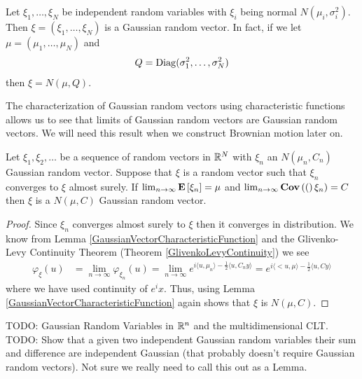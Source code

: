 \begin{examp}Let $\xi_1, \dots, \xi_N$ be independent random variables
  with $\xi_i$ being normal $N(\mu_i, \sigma_i^2)$.  Then $\xi =
  (\xi_1, \dots, \xi_N)$ is a Gaussian random vector.  In fact, if we
  let $\mu = (\mu_1, \dots, \mu_N)$ and 
\begin{align*}
Q = \operatorname*{Diag}(\sigma_1^2, \dots, \sigma_N^2)
\end{align*}
then $\xi = N(\mu, Q)$.
\end{examp}

The characterization of Gaussian random vectors using characteristic
functions allows us to see that limits of Gaussian random vectors are
Gaussian random vectors.  We will need this result when we construct
Brownian motion later on.
\begin{lem}\label{LimitOfGaussianRandomVectors}Let $\xi_1, \xi_2, \dots$ be a sequence of random
  vectors in $\mathbb{R}^N$ with $\xi_n$ an $N(\mu_n, C_n)$ Gaussian
  random vector.  Suppose that $\xi$ is a random vector such
  that $\xi_n$ converges to $\xi$ almost surely.  If $\lim_{n \to
    \infty} \textbf{E}\left[\xi_n\right] = \mu$ and $\lim_{n \to \infty}
  \textbf{Cov} \left (( \right )\xi_n) = C$ then $\xi$ is a $N(\mu, C)$ Gaussian random vector.
\end{lem}
\begin{proof}
Since $\xi_n$ converges almost surely to $\xi$ then it converges in
distribution.  We know from Lemma
\ref{GaussianVectorCharacteristicFunction} and the Glivenko-Levy
Continuity Theorem (Theorem \ref{GlivenkoLevyContinuity}) we see
\begin{align*}
\varphi_\xi(u) &= \lim_{n \to \infty} \varphi_{\xi_n}(u) = \lim_{n \to
  \infty} e^{i\langle u, \mu_n\rangle - \frac{1}{2}\langle u, C_n
  y\rangle} = e^{i\langle<u, \mu\rangle - \frac{1}{2}\langle u, C
  y\rangle} 
\end{align*}
where we have used continuity of $e^ix$.  Thus, using Lemma
\ref{GaussianVectorCharacteristicFunction}
again shows that $\xi$ is $N(\mu, C)$.
\end{proof}

TODO: Gaussian Random Variables in $\mathbb{R}^n$ and the multidimensional
CLT.
TODO: Show that a
given two independent Gaussian random variables their sum and
difference are independent Gaussian (that probably doesn't require
Gaussian random vectors).  Not sure we really need to call this out as a Lemma.
